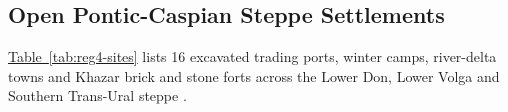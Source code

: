 \IfFileExists{../../_shared/template/intellte.cls}{\documentclass[10pt,onecolumn]{../../_shared/template/intellte}}{\documentclass[10pt,onecolumn]{intellte}}
\providecommand{\crdxref}[2]{\hyperref[#2]{#1~\ref*{#2}}}
\begin{document}
\subsection{Open Pontic-Caspian Steppe
Settlements}\label{open-pontic-caspian-steppe-settlements}

\crdxref{Table}{tab:reg4-sites} lists 16 excavated trading ports, winter
camps, river-delta towns and Khazar brick and stone forts across the
Lower Don, Lower Volga and Southern Trans-Ural steppe
.

\par\vspace{4pt}
\begingroup\fontsize{10pt}{14pt}\selectfont\normalfont\rmfamily\mdseries
\setlength{\tabcolsep}{3pt}
\renewcommand{\arraystretch}{1.0}
\setlength{\LTpre}{4pt}
\setlength{\LTpost}{4pt}
\setlength{\LTcapwidth}{\textwidth}
\end{document}
